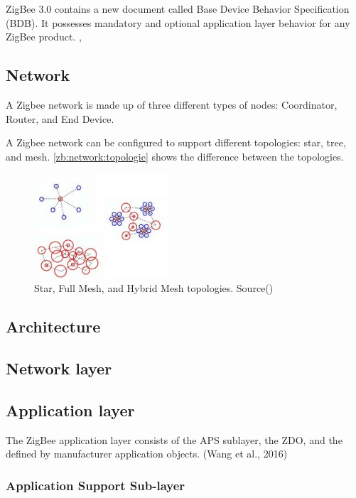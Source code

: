 ZigBee 3.0 contains a new document called Base Device Behavior Specification (BDB).
It possesses mandatory and optional application layer behavior for any ZigBee product. \cite{ti:new:19}, \cite{Morgner:2017}

\subsection{Network}
\label{zb:net:intro}

A Zigbee network is made up of three different types of nodes: Coordinator, Router, and End Device. \cite{Whitehurst:14}

A Zigbee network can be configured to support different topologies: star, tree, and mesh. \autoref{zb:network:topologie} shows the difference between the topologies.

\begin{figure}[!ht]
    \centering
    \includegraphics[width=50mm, keepaspectratio]{figures/zigbee-topology-ug103-02-fundamentals-zigbee.jpg}
    \caption{Star, Full Mesh, and Hybrid Mesh topologies. Source(\cite{zigbee:silabs:ug103:2})}
    \label{zb:network:topologie}
\end{figure}

\subsection{Architecture}
\subsection{Network layer}
\subsection{Application layer}

The ZigBee application layer consists of the APS sublayer, the ZDO, and the deﬁned by manufacturer application objects. (Wang et al., 2016)
\cite{nxp:2016}

\subsubsection{Application Support Sub-layer}


